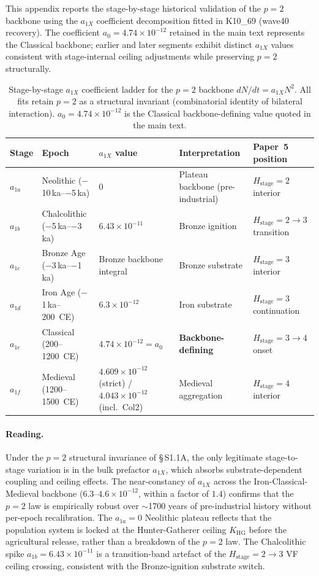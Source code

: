 \documentclass[11pt]{article}
\begin{document}
This appendix reports the stage-by-stage historical validation of the $p=2$ backbone using the $a_{1X}$ coefficient decomposition fitted in K10\_69 (wave40 recovery).  The coefficient $a_0=4.74\times 10^{-12}$ retained in the main text represents the Classical backbone; earlier and later segments exhibit distinct $a_{1X}$ values consistent with stage-internal ceiling adjustments while preserving $p=2$ structurally.

\begin{table}[H]\centering
\caption{Stage-by-stage $a_{1X}$ coefficient ladder for the $p=2$ backbone $dN/dt=a_{1X}N^2$. All fits retain $p=2$ as a structural invariant (combinatorial identity of bilateral interaction).  $a_0=4.74\times 10^{-12}$ is the Classical backbone-defining value quoted in the main text.}
\label{tab:S-K10Hist-a1X}
\begin{tabular}{lllll}
\toprule
Stage & Epoch & $a_{1X}$ value & Interpretation & Paper~5 position \\
\midrule
$a_{1a}$ & Neolithic ($-$10\,ka--$-$5\,ka) & $0$ & Plateau backbone (pre-industrial) & $H_{\mathrm{stage}}=2$ interior \\
$a_{1b}$ & Chalcolithic ($-$5\,ka--$-$3\,ka) & $6.43\times 10^{-11}$ & Bronze ignition & $H_{\mathrm{stage}}=2\to 3$ transition \\
$a_{1c}$ & Bronze Age ($-$3\,ka--$-$1\,ka) & Bronze backbone integral & Bronze substrate & $H_{\mathrm{stage}}=3$ interior \\
$a_{1d}$ & Iron Age ($-$1\,ka--200~CE) & $6.3\times 10^{-12}$ & Iron substrate & $H_{\mathrm{stage}}=3$ continuation \\
$a_{1e}$ & Classical (200--1200~CE) & $4.74\times 10^{-12}=a_0$ & \textbf{Backbone-defining} & $H_{\mathrm{stage}}=3\to 4$ onset \\
$a_{1f}$ & Medieval (1200--1500~CE) & $4.609\times 10^{-12}$ (strict) / $4.043\times 10^{-12}$ (incl.\ Col2) & Medieval aggregation & $H_{\mathrm{stage}}=4$ interior \\
\bottomrule
\end{tabular}
\end{table}

\paragraph{Reading.} Under the $p=2$ structural invariance of \S\,S1.1A, the only legitimate stage-to-stage variation is in the bulk prefactor $a_{1X}$, which absorbs substrate-dependent coupling and ceiling effects.  The near-constancy of $a_{1X}$ across the Iron-Classical-Medieval backbone ($6.3$--$4.6\times 10^{-12}$, within a factor of $1.4$) confirms that the $p=2$ law is empirically robust over $\sim$1700 years of pre-industrial history without per-epoch recalibration.  The $a_{1a}=0$ Neolithic plateau reflects that the population system is locked at the Hunter-Gatherer ceiling $K_{\mathrm{HG}}$ before the agricultural release, rather than a breakdown of the $p=2$ law.  The Chalcolithic spike $a_{1b}=6.43\times 10^{-11}$ is a transition-band artefact of the $H_{\mathrm{stage}}=2\to 3$ VF ceiling crossing, consistent with the Bronze-ignition substrate switch.
\end{document}

